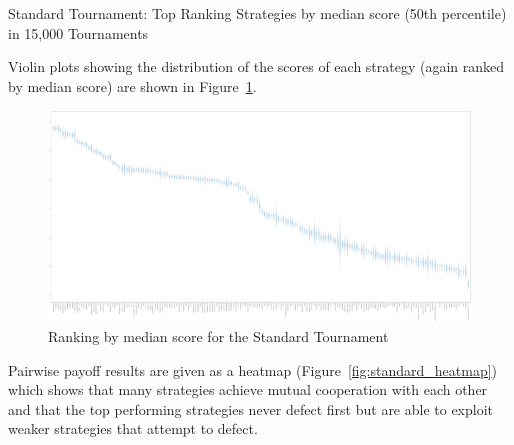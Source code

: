 \documentclass{article}
\begin{document}
\begin{table}[!hbtp]
    \centering
        
        \caption{Standard Tournament: Top Ranking Strategies by median score
        (50th percentile) in 15,000 Tournaments}
        \label{tbl:standard_score}
\end{table}

Violin plots showing the distribution of the scores of each strategy (again
ranked by median score) are shown in Figure~\ref{fig:standard_boxplot}.

\begin{landscape}
    \begin{figure}[!hbtp]
        \includegraphics[width=\paperwidth]{./assets/standard_scores_boxplots.pdf}
        \caption{Ranking by median score for the Standard Tournament}
        \label{fig:standard_boxplot}
    \end{figure}
\end{landscape}

Pairwise payoff results are given as a heatmap (Figure~\ref{fig:standard_heatmap})
which shows that many strategies achieve mutual cooperation with each other and
that the top performing strategies never defect first but are able to exploit
weaker strategies that attempt to defect.
\end{document}
